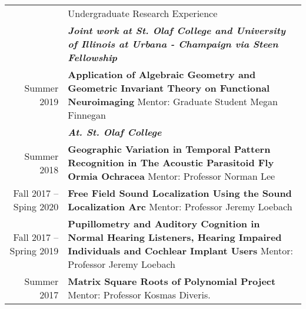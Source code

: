 \documentclass[letterpaper, 11pt]{article}
\newcommand{\headingfont}{\Large\color{Red}}
\newenvironment{SectionTable}[1]{
	\renewcommand*{\arraystretch}{1.7}
	\setlength{\tabcolsep}{10pt}
	\begin{longtable}{Rp{5.2in}} & #1 \\}
	{\end{longtable}\vspace{-.3cm}}
\begin{document}
	\begin{SectionTable}{\headingfont Undergraduate Research Experience}
		
		& \textit{\textbf{Joint work at St. Olaf College and University of Illinois at Urbana - Champaign via Steen Fellowship}}\\
		Summer 2019 &
		\textbf{Application of Algebraic Geometry and Geometric Invariant Theory on Functional Neuroimaging} \newline
		Mentor:  Graduate Student Megan Finnegan \\
		& \textit{\textbf{At. St. Olaf College}} \\
		Summer 2018 &
		\textbf{Geographic Variation in Temporal Pattern Recognition in The Acoustic Parasitoid Fly Ormia Ochracea} \newline
		Mentor:  Professor Norman Lee \\
		Fall 2017 -- Sping 2020 &
		\textbf{Free Field Sound Localization Using the Sound Localization Arc} \newline
		Mentor:  Professor Jeremy Loebach \\
		Fall 2017 -- Spring 2019  &
		\textbf{Pupillometry and Auditory Cognition in Normal Hearing Listeners, Hearing Impaired Individuals and Cochlear Implant Users} \newline
		Mentor: Professor Jeremy Loebach \\

		Summer 2017  &
		\textbf{Matrix Square Roots of Polynomial Project} \newline
		Mentor: Professor Kosmas Diveris. \\
	\end{SectionTable}
	
\end{document}
